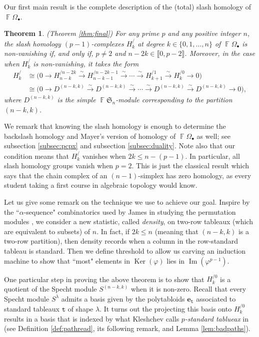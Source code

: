 \documentclass[a4paper]{amsart}
\numberwithin{equation}{subsection}
\newtheorem*{theorem*}{Theorem}
\theoremstyle{definition}
\DeclareMathOperator{\F}{\mathbb{F}}
\newcommand{\interval}[1]{\llbracket #1 \rrbracket}
\DeclareMathOperator{\Ker}{\mathrm{Ker}}
\DeclareMathOperator{\Image}{\mathrm{Im}}
\newcommand{\bfe}{\pmb{e}}
\newcommand{\tbx}{\mathtt{t}}
\numberwithin{equation}{subsection}
\begin{document}
Our first main result is the complete description of the (total) slash homology of $\F\Omega_\bullet$.  
\begin{theorem*}{\rm (Theorem \ref{thm:final})}
For any prime $p$ and any positive integer $n$, the slash homology $(p-1)$-complexes $H_k^{/}$ at degree $k\in\{0,1, \ldots, n\}$ of $\F\Omega_\bullet$ is non-vanishing if, and only if, $p\neq 2$ and $n-2k\in\interval{0,p-2}$.
Moreover, in the case when $H_k^{/}$ is non-vanishing, it takes the form
\begin{align*}
H_k^{/} &\cong  \big( 0 \to H_{n-k}^{/n-2k} \xrightarrow{\sim} H_{n-k-1}^{/n-2k-1} \xrightarrow{\sim} \cdots \xrightarrow{\sim} H_{k+1}^{/1} \xrightarrow{\sim} H_k^{/0} \to 0 \big) \\
&\cong \big( 0 \to D^{(n-k,k)} \xrightarrow{\sim} D^{(n-k,k)} \xrightarrow{\sim} \cdots \xrightarrow{\sim} D^{(n-k,k)}\xrightarrow{\sim} D^{(n-k,k)}\to 0),
\end{align*}
where $D^{(n-k,k)}$ is the simple $\F\mathfrak{S}_n$-module corresponding to the partition $(n-k,k)$.
\end{theorem*}
We remark that knowing the slash homology is enough to determine the backslash homology and Mayer's version of homology of $\F\Omega_\bullet$ as well; see subsection \ref{subsec:pcpx} and subsection \ref{subsec:duality}.
Note also that our condition means that $H_k^{/}$ vanishes when $2k\leq n-(p-1)$.
In particular, all slash homology groups vanish when $p=2$.  This is just the classical result which says that the chain complex of an $(n-1)$-simplex has zero homology, as every student taking a first course in algebraic topology would know.

Let us give some remark on the technique we use to achieve our goal.
Inspire by the ``$\alpha$-sequence" combinatorics used by James in studying the permutation modules \cite{James2}, we consider a new statistic, called \emph{density}, on two-row tableaux (which are equivalent to subsets) of $n$.  In fact, if $2k\leq n$ (meaning that $(n-k,k)$ is a two-row partition), then density records when a column in the row-standard tableau is standard. Then we define threshold to allow us carving an induction machine to show that ``most" elements in $\Ker(\varphi)$ lies in $\Image(\varphi^{p-1})$.

\smallskip 

One particular step in proving the above theorem is to show that $H_k^{/0}$ is a quotient of the Specht module $S^{(n-k,k)}$ when it is non-zero.  Recall that every Specht module $S^\lambda$ admits a basis given by the polytabloids $\bfe_\tbx$ associated to standard tableaux $\tbx$ of shape $\lambda$.  It turns out the projecting this basis onto $H_k^{/0}$ results in a basis that is indexed by what Kleshchev calls \emph{$p$-standard tablueax} in \cite{Kl} (see Definition \ref{def:pathread}, its following remark, and Lemma \ref{lem:badpaths}).
\end{document}
